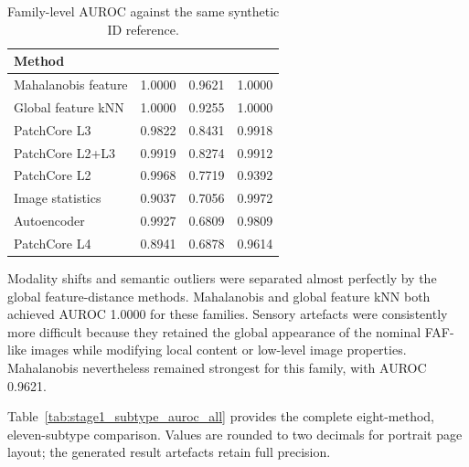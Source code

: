 \documentclass[fleqn,12pt]{olplainarticle}
\begin{document}
\begin{table}[H]
    \centering
    \caption[Stage~1 AUROC by OOD family.]
    {Family-level AUROC against the same synthetic ID reference.}
    \label{tab:stage1_family_auroc}
    \footnotesize
    \setlength{\tabcolsep}{4.2pt}
    \renewcommand{\arraystretch}{1.01}
    \begin{tabularx}{0.82\textwidth}{@{}
        >{\raggedright\arraybackslash}X
        S[table-format=1.4]
        S[table-format=1.4]
        S[table-format=1.4]
    @{}}
        \toprule
        \textbf{Method} &
        {} &
        {} &
        {} \\
        \midrule
        Mahalanobis feature & 1.0000 & 0.9621 & 1.0000 \\
        Global feature kNN & 1.0000 & 0.9255 & 1.0000 \\
        PatchCore L3 & 0.9822 & 0.8431 & 0.9918 \\
        PatchCore L2+L3 & 0.9919 & 0.8274 & 0.9912 \\
        PatchCore L2 & 0.9968 & 0.7719 & 0.9392 \\
        Image statistics & 0.9037 & 0.7056 & 0.9972 \\
        Autoencoder & 0.9927 & 0.6809 & 0.9809 \\
        PatchCore L4 & 0.8941 & 0.6878 & 0.9614 \\
        \bottomrule
    \end{tabularx}
\end{table}

Modality shifts and semantic outliers were separated almost perfectly by the
global feature-distance methods. Mahalanobis and global feature kNN both
achieved AUROC 1.0000 for these families. Sensory artefacts were consistently
more difficult because they retained the global appearance of the nominal
FAF-like images while modifying local content or low-level image properties.
Mahalanobis nevertheless remained strongest for this family, with AUROC
0.9621.

Table~\ref{tab:stage1_subtype_auroc_all} provides the complete
eight-method, eleven-subtype comparison. Values are rounded to two decimals for portrait
page layout; the generated result artefacts retain full precision.
\end{document}
